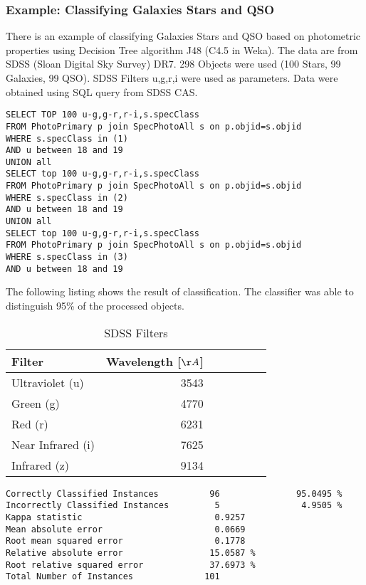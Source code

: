 \subsubsection{Example: Classifying Galaxies Stars and QSO}
There is an example of classifying Galaxies Stars and QSO based on
photometric properties using Decision Tree algorithm J48 (C4.5 in
Weka). The data are from SDSS (Sloan Digital Sky Survey) DR7. 298
Objects were used (100 Stars, 99 Galaxies, 99 QSO). SDSS Filters
u,g,r,i were used as parameters. Data were obtained using SQL query
from SDSS CAS.

\begin{lstlisting}
SELECT TOP 100 u-g,g-r,r-i,s.specClass
FROM PhotoPrimary p join SpecPhotoAll s on p.objid=s.objid 
WHERE s.specClass in (1)
AND u between 18 and 19
UNION all
SELECT top 100 u-g,g-r,r-i,s.specClass
FROM PhotoPrimary p join SpecPhotoAll s on p.objid=s.objid 
WHERE s.specClass in (2)
AND u between 18 and 19
UNION all
SELECT top 100 u-g,g-r,r-i,s.specClass
FROM PhotoPrimary p join SpecPhotoAll s on p.objid=s.objid 
WHERE s.specClass in (3)
AND u between 18 and 19
\end{lstlisting}

The following listing shows the result of classification. The
classifier was able to distinguish 95\% of the processed objects.

\begin{table}[ht]
  \centering
  \small
     \begin{tabular}[ht]{l r@{,}l r@{,}l l l}
     \toprule
     Filter & Wavelength [$\AA$] \\
     \midrule
     Ultraviolet (u) & 3543 \\
     Green (g) & 4770\\
     Red (r) & 6231\\
     Near Infrared (i) & 7625\\
     Infrared (z) & 9134 \\
     \bottomrule
   \end{tabular}
  \caption{SDSS Filters}
  \label{tab:SDSSFilter}
\end{table}


\begin{lstlisting}
Correctly Classified Instances          96               95.0495 %
Incorrectly Classified Instances         5                4.9505 %
Kappa statistic                          0.9257
Mean absolute error                      0.0669
Root mean squared error                  0.1778
Relative absolute error                 15.0587 %
Root relative squared error             37.6973 %
Total Number of Instances              101     
\end{lstlisting}

